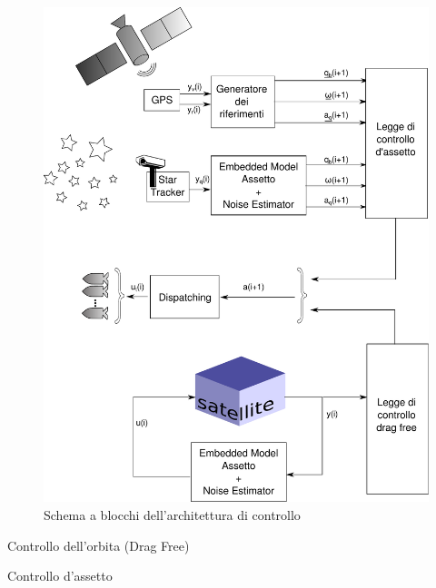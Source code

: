 \begin{figure}[ht!]
	\includegraphics[width=\textwidth]{control/images/control.pdf}
	\caption{Schema a blocchi dell'architettura di controllo}
\end{figure}
\begin{section}{Controllo dell'orbita (Drag Free)}

\end{section}
\begin{section}{Controllo d'assetto}

\end{section}